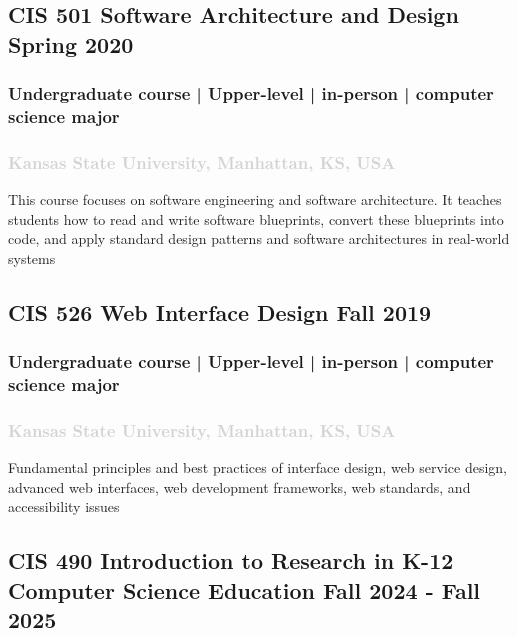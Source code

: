 \documentclass[11pt]{article}
\begin{document}
       \subsection{ CIS 501 Software Architecture and Design   \hfill \normalfont Spring 2020 }
        \subsubsection{ Undergraduate course | Upper-level | in-person | computer science major   }
  \subsubsection{ \normalfont \textcolor{lightgray}{ Kansas State University, Manhattan, KS, USA   }}
        \vspace{0.4em} %
          \noindent This course focuses on software engineering and software architecture. It teaches students how to read and write software blueprints, convert these blueprints into code, and apply standard design patterns and software architectures in real-world systems

\label{sec: CIS526} 
   \vspace{0.8em} %
   
  \subsection{ CIS 526 Web Interface Design   \hfill \normalfont Fall 2019 }
     \subsubsection{ Undergraduate course | Upper-level | in-person | computer science major   }
  \subsubsection{ \normalfont \textcolor{lightgray}{Kansas State University, Manhattan, KS, USA   }}
    \vspace{0.4em} %
   \noindent Fundamental principles and best practices of interface design, web service design, advanced web interfaces, web development frameworks, web standards, and accessibility issues

\label{sec: CIS490} 
   \vspace{0.8em} %

  \subsection{ CIS 490 Introduction to Research in K-12 Computer Science Education  \hfill \normalfont  Fall 2024 - Fall 2025  }
\end{document}
